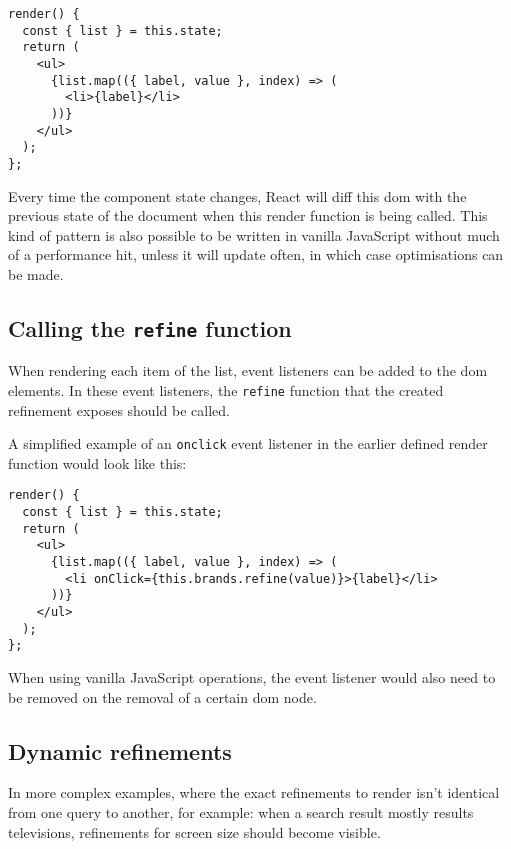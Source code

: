 \begin{minipage}{\linewidth}
\begin{lstlisting}[caption={Taking the data from the refinement and applying it to DOM},label={lst:core-react-dom}]
render() {
  const { list } = this.state;
  return (
    <ul>
      {list.map(({ label, value }, index) => (
        <li>{label}</li>
      ))}
    </ul>
  );
};
\end{lstlisting}
\end{minipage}

Every time the component state changes, React will \gls{diff} this \acrshort{dom} with the previous state of the document when this render function is being called. This kind of pattern is also possible to be written in vanilla JavaScript without much of a performance hit, unless it will update often, in which case optimisations can be made.

\subsection{Calling the {\tt refine} function}
\label{subs:refining}

When rendering each item of the list, event listeners can be added to the \acrshort{dom} elements. In these event listeners, the {\tt refine} function that the created refinement exposes should be called.

A simplified example of an {\tt onclick} event listener in the earlier defined render function would look like this:

\begin{minipage}{\linewidth}
\begin{lstlisting}[caption={Refining on a user action},label={lst:core-react-refine}]
render() {
  const { list } = this.state;
  return (
    <ul>
      {list.map(({ label, value }, index) => (
        <li onClick={this.brands.refine(value)}>{label}</li>
      ))}
    </ul>
  );
};
\end{lstlisting}
\end{minipage}

When using vanilla JavaScript operations, the event listener would also need to be removed on the removal of a certain \acrshort{dom} node.

\subsection{Dynamic \glspl{refinement}}
\label{dynamic_refinements}

In more complex examples, where the exact refinements to render isn't identical from one query to another, for example: when a search result mostly results televisions, refinements for screen size should become visible. 

